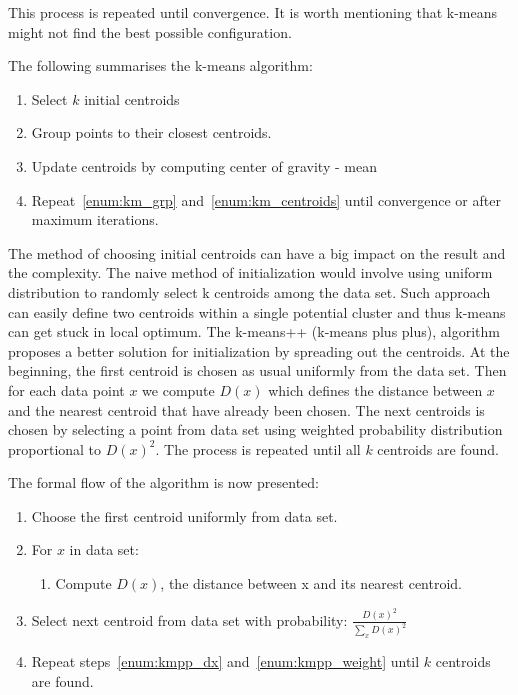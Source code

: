 \documentclass{mini}
\begin{document}
This process is repeated until convergence. It is worth mentioning that k-means might not find the best possible 
configuration.

The following summarises the k-means algorithm:

\begin{center}
    
    
    \begin{enumerate}
        \item 
        Select $k$ initial centroids
        \item \label{enum:km_grp} 
        Group points to their closest centroids.
        \item \label{enum:km_centroids} 
        Update centroids by computing center of gravity - mean
        \item 
        Repeat~\ref{enum:km_grp} and~\ref{enum:km_centroids} until convergence or after maximum iterations.
    \end{enumerate}
    
\end{center}

The method of choosing initial centroids can have a big impact on the result and the complexity. The naive method of initialization would involve using uniform distribution to randomly select k centroids among the data set. Such approach can easily define two centroids within a single potential cluster and thus k-means can get stuck in local optimum.
The k-means++ (k-means plus plus), algorithm proposes a better solution for initialization by spreading out the centroids. At the beginning, the first centroid is chosen as usual uniformly from the data set. Then for each data point $x$ we compute $D(x)$ which defines the distance between $x$ and the nearest centroid that have already been chosen. The next centroids is chosen by selecting a point from data set using weighted probability distribution proportional to $D(x)^2$. The process is repeated until all $k$ centroids are found.

The formal flow of the algorithm is now presented:

\begin{enumerate}
    \item 
    Choose the first centroid uniformly from data set.
    \item \label{enum:kmpp_dx}
    For $x$ in data set:
    \begin{enumerate}
        \item
        Compute $D(x)$, the distance between x and its nearest centroid.
    \end{enumerate}
    
    \item \label{enum:kmpp_weight}
    Select next centroid from data set with probability:
    $\frac{D(x)^2}{\sum_{x}D(x)^2}$
    \item 
    Repeat steps~\ref{enum:kmpp_dx} and~\ref{enum:kmpp_weight} until $k$ centroids are found.
\end{enumerate}
\end{document}
